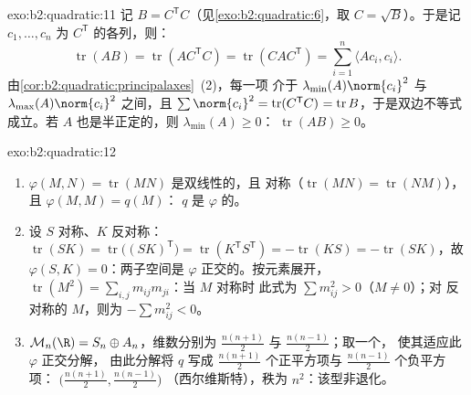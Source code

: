\begin{solution}{exo:b2:quadratic:11}
记 $B = C^{\mathsf T}C$（见\cref{exo:b2:quadratic:6}，取 $C =
\sqrt B$）。于是记 $c_1, \dots, c_n$ 为
$C^{\mathsf T}$ 的各列，则：
\[
\operatorname{tr}(AB) = \operatorname{tr}(AC^{\mathsf T}C)
= \operatorname{tr}(CAC^{\mathsf T})
= \sum_{i=1}^n \langle A c_i, c_i\rangle .
\]
由\cref{cor:b2:quadratic:principalaxes}~(2)，每一项
介于 $\lambda_{\min}(A)\norm{c_i}^2$ 与
$\lambda_{\max}(A)\norm{c_i}^2$ 之间，且 $\sum\norm{c_i}^2 =
\operatorname{tr}(C^{\mathsf T}C)^{\vphantom1} =
\operatorname{tr} B$，于是双边不等式成立。若 $A$
也是半正定的，则 $\lambda_{\min}(A) \geq 0$：
$\operatorname{tr}(AB) \geq 0$。
\end{solution}

\begin{solution}{exo:b2:quadratic:12}
\begin{enumerate}
  \item $\varphi(M, N) = \operatorname{tr}(MN)$ 是双线性的，且
        对称（$\operatorname{tr}(MN) =
        \operatorname{tr}(NM)$），且 $\varphi(M, M) = q(M)$：
        $q$ 是 $\varphi$ 的。
  \item 设 $S$ 对称、$K$ 反对称：
        $\operatorname{tr}(SK) =
        \operatorname{tr}\bigl((SK)^{\mathsf T}\bigr) =
        \operatorname{tr}(K^{\mathsf T}S^{\mathsf T}) =
        -\operatorname{tr}(KS) = -\operatorname{tr}(SK)$，故
        $\varphi(S, K) = 0$：两子空间是
        $\varphi$ 正交的。按元素展开，$\operatorname{tr}
        (M^2) = \sum_{i,j} m_{ij}m_{ji}$：当 $M$ 对称时
        此式为 $\sum m_{ij}^2 > 0$（$M \neq 0$）；对
        反对称的 $M$，则为 $-\sum m_{ij}^2 < 0$。
  \item $\mathcal M_n(\R) = S_n \oplus A_n$，维数分别为
        $\frac{n(n+1)}2$ 与 $\frac{n(n-1)}2$；取一个，
        使其适应此 $\varphi$ 正交分解，
        由此分解将 $q$ 写成 $\frac{n(n+1)}2$ 个正平方项与
        $\frac{n(n-1)}2$ 个负平方项：
        $\bigl(\frac{n(n+1)}2, \frac{n(n-1)}2\bigr)$
        （西尔维斯特），秩为 $n^2$：该型非退化。
\end{enumerate}
\end{solution}

